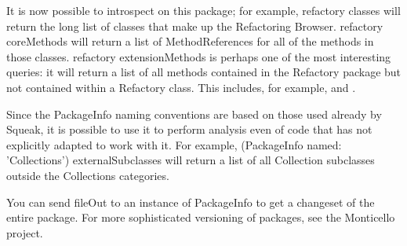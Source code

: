 \documentclass[a4paper,10pt,twoside]{book}
\begin{document}
It is now possible to introspect on this package; for example, refactory classes will return the long list of classes that make up the Refactoring Browser. refactory coreMethods will return a list of MethodReferences for all of the methods in those classes. refactory extensionMethods is perhaps one of the most interesting queries: it will return a list of all methods contained in the Refactory package but not contained within a Refactory class. This includes, for example,  and .

Since the PackageInfo naming conventions are based on those used already by Squeak, it is possible to use it to perform analysis even of code that has not explicitly adapted to work with it. For example, (PackageInfo named: 'Collections') externalSubclasses will return a list of all Collection subclasses outside the Collections categories.

You can send fileOut to an instance of PackageInfo to get a changeset of the entire package. For more sophisticated versioning of packages, see the Monticello project.


\ifx\wholebook\relax\else
   
   
\end{document}
